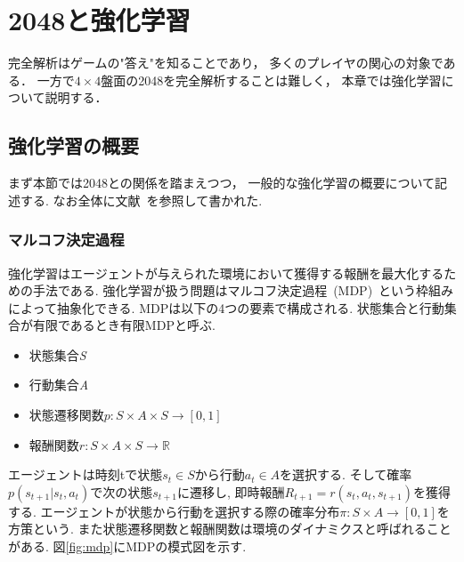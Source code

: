 \chapter{2048と強化学習}
\label{chap:rl}
完全解析はゲームの"答え"を知ることであり， 多くのプレイヤの関心の対象である．
一方で$4\times4$盤面の2048を完全解析することは難しく， 
本章では強化学習について説明する．

\section{強化学習の概要}
\label{sec:rl_general}
まず本節では2048との関係を踏まえつつ， 一般的な強化学習の概要について記述する.
なお全体に文献~\cite{Sutton1998}を参照して書かれた.

\subsection{マルコフ決定過程}
\label{subsec:mdp}
強化学習はエージェントが与えられた環境において獲得する報酬を最大化するための手法である.
強化学習が扱う問題はマルコフ決定過程~(MDP)~という枠組みによって抽象化できる. 
MDPは以下の4つの要素で構成される. 状態集合と行動集合が有限であるとき有限MDPと呼ぶ.
\begin{itemize}
  \item 状態集合\textit{S}
  \item 行動集合\textit{A}
  \item 状態遷移関数$p:S \times A \times S \rightarrow [0,1]$
  \item 報酬関数$r:S \times A \times S \rightarrow \mathbb{R}$
\end{itemize}
エージェントは時刻tで状態$s_t \in S$から行動$a_t \in A$を選択する.
そして確率$p(s_{t+1}|s_t,a_t)$で次の状態$s_{t+1}$に遷移し, 即時報酬$R_{t+1}=r(s_t,a_t,s_{t+1})$を獲得する.
エージェントが状態から行動を選択する際の確率分布$\pi:S \times A \rightarrow [0,1]$を方策という. 
また状態遷移関数と報酬関数は環境のダイナミクスと呼ばれることがある. 
図\ref{fig:mdp}にMDPの模式図を示す.

